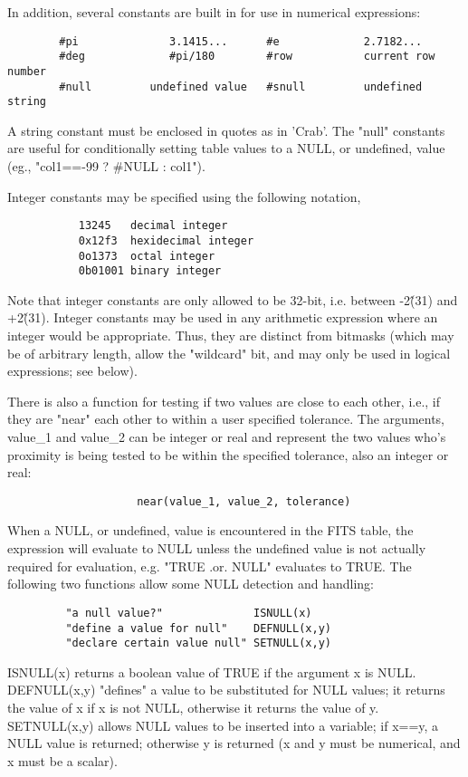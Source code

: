 \documentclass[11pt]{book}
\begin{document}
    In addition, several constants are built in  for  use  in  numerical
    expressions:


\begin{verbatim}
        #pi              3.1415...      #e             2.7182...
        #deg             #pi/180        #row           current row number
        #null         undefined value   #snull         undefined string
\end{verbatim}

    A  string constant must  be enclosed  in quotes  as in  'Crab'.  The
    "null" constants  are useful for conditionally  setting table values
    to a NULL, or undefined, value (eg., "col1==-99 ? \#NULL : col1").

    Integer constants may be specified using the following notation,
\begin{verbatim}
           13245   decimal integer
           0x12f3  hexidecimal integer
           0o1373  octal integer
           0b01001 binary integer
\end{verbatim}
    Note that integer constants are only allowed to be 32-bit, i.e.
    between -2\^(31) and +2\^(31).  Integer constants may be used in any
    arithmetic expression where an integer would be appropriate.  Thus,
    they are distinct from bitmasks (which may be of arbitrary length,
    allow the "wildcard" bit, and may only be used in logical
    expressions; see below).

    There is also a function for testing if  two  values  are  close  to
    each  other,  i.e.,  if  they are "near" each other to within a user
    specified tolerance. The  arguments,  value\_1  and  value\_2  can  be
    integer  or  real  and  represent  the two values who's proximity is
    being tested to be within the specified tolerance, also  an  integer
    or real:

\begin{verbatim}
                    near(value_1, value_2, tolerance)
\end{verbatim}
    When  a  NULL, or undefined, value is encountered in the FITS table,
    the expression will evaluate to NULL unless the undefined  value  is
    not   actually   required  for  evaluation,  e.g. "TRUE  .or.  NULL"
    evaluates to TRUE. The  following  two  functions  allow  some  NULL
    detection  and  handling:

\begin{verbatim}
         "a null value?"              ISNULL(x)
         "define a value for null"    DEFNULL(x,y)
         "declare certain value null" SETNULL(x,y)
\end{verbatim}
    ISNULL(x)
    returns a boolean value of TRUE if the  argument  x  is  NULL. DEFNULL(x,y)
    "defines"  a  value  to  be  substituted  for NULL values; it
    returns the value of x if x is not NULL, otherwise  it  returns  the
    value of y.  SETNULL(x,y) allows NULL values to be inserted into
    a variable; if x==y, a NULL value is returned; otherwise y is returned
    (x and y must be numerical, and x must be a scalar).
\end{document}
